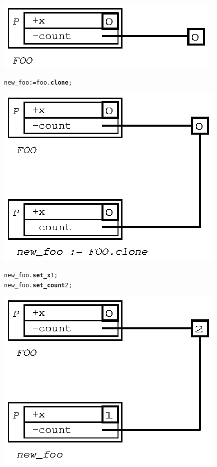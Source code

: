 \documentclass[11pt]{mybook}
\begin{document}
\begin{center}
\includegraphics[scale=1.0]{figures/quick_clone0}
\end{center}

\begin{alltt}
  new\_foo := {\sc{}foo}.{\bf{}clone};
\end{alltt}

\begin{center}
\includegraphics[scale=1.0]{figures/quick_clone1} 
\end{center}

\begin{alltt}
  new\_foo.{\bf{}set\_x} 1;
  new\_foo.{\bf{}set\_count} 2;
\end{alltt}

\begin{center}
\includegraphics[scale=1.0]{figures/quick_clone2}
\end{center}
\end{document}
